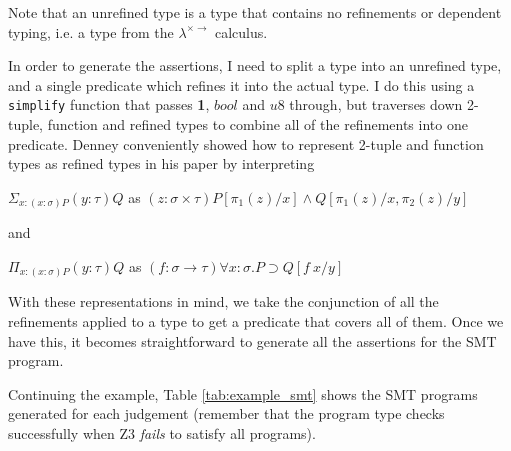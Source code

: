 Note that an unrefined type is a type that contains no refinements or dependent typing, i.e. a type
from the $\lambda^{\times \rightarrow}$ calculus.

In order to generate the assertions, I need to split a type into an unrefined type, and a single
predicate which refines it into the actual type.
I do this using a \texttt{simplify} function that passes \textbf{1}, $bool$ and $u8$ through,
but traverses down 2-tuple, function and refined types to combine all of the refinements into one
predicate.
Denney conveniently showed how to represent 2-tuple and function types as refined types in his paper
by interpreting

\begin{center}
    $\Sigma_{x:(x:\sigma)P} (y:\tau)Q$
    \quad as \quad
    $(z: \sigma \times \tau)P[\pi_1(z)/x] \land Q[\pi_1(z)/x, \pi_2(z)/y]$

    and

    $\Pi_{x:(x:\sigma)P} (y:\tau)Q$
    \quad as \quad
    $(f: \sigma \rightarrow \tau) \forall x : \sigma . P \supset Q[f\ x / y]$
\end{center}

With these representations in mind, we take the conjunction of all the refinements applied to a type
to get a predicate that covers all of them.
Once we have this, it becomes straightforward to generate all the assertions for the SMT program.

Continuing the example, Table \ref{tab:example_smt} shows the SMT programs generated for each
judgement (remember that the program type checks successfully when Z3 \textit{fails} to satisfy all
programs).

